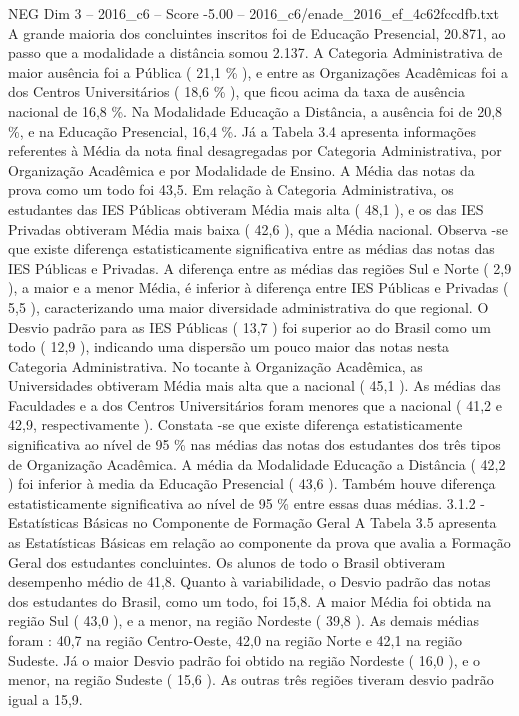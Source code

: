 \begin{textsample}{NEG Dim 3 – 2016\_c6 – Score -5.00 – 2016\_c6/enade\_2016\_ef\_4c62fccdfb.txt}
A grande maioria dos concluintes inscritos foi de Educação Presencial, 20.871, ao passo que a modalidade a distância somou 2.137.
A Categoria Administrativa de maior ausência foi a Pública ( 21,1 \% ), e entre as Organizações Acadêmicas foi a dos Centros Universitários ( 18,6 \% ), que ficou acima da taxa de ausência nacional de 16,8 \%.
Na Modalidade Educação a Distância, a ausência foi de 20,8 \%, e na Educação Presencial, 16,4 \%.
Já a Tabela 3.4 apresenta informações referentes à Média da nota final desagregadas por Categoria Administrativa, por Organização Acadêmica e por Modalidade de Ensino.
A Média das notas da prova como um todo foi 43,5.
Em relação à Categoria Administrativa, os estudantes das IES Públicas obtiveram Média mais alta ( 48,1 ), e os das IES Privadas obtiveram Média mais baixa ( 42,6 ), que a Média nacional.
Observa -se que existe diferença estatisticamente significativa entre as médias das notas das IES Públicas e Privadas.
A diferença entre as médias das regiões Sul e Norte ( 2,9 ), a maior e a menor Média, é inferior à diferença entre IES Públicas e Privadas ( 5,5 ), caracterizando uma maior diversidade administrativa do que regional.
O Desvio padrão para as IES Públicas ( 13,7 ) foi superior ao do Brasil como um todo ( 12,9 ), indicando uma dispersão um pouco maior das notas nesta Categoria Administrativa.
No tocante à Organização Acadêmica, as Universidades obtiveram Média mais alta que a nacional ( 45,1 ).
As médias das Faculdades e a dos Centros Universitários foram menores que a nacional ( 41,2 e 42,9, respectivamente ).
Constata -se que existe diferença estatisticamente significativa ao nível de 95 \% nas médias das notas dos estudantes dos três tipos de Organização Acadêmica.
A média da Modalidade Educação a Distância ( 42,2 ) foi inferior à media da Educação Presencial ( 43,6 ).
Também houve diferença estatisticamente significativa ao nível de 95 \% entre essas duas médias. 3.1.2 - Estatísticas Básicas no Componente de Formação Geral A Tabela 3.5 apresenta as Estatísticas Básicas em relação ao componente da prova que avalia a Formação Geral dos estudantes concluintes.
Os alunos de todo o Brasil obtiveram desempenho médio de 41,8.
Quanto à variabilidade, o Desvio padrão das notas dos estudantes do Brasil, como um todo, foi 15,8.
A maior Média foi obtida na região Sul ( 43,0 ), e a menor, na região Nordeste ( 39,8 ).
As demais médias foram : 40,7 na região Centro-Oeste, 42,0 na região Norte e 42,1 na região Sudeste.
Já o maior Desvio padrão foi obtido na região Nordeste ( 16,0 ), e o menor, na região Sudeste ( 15,6 ).
As outras três regiões tiveram desvio padrão igual a 15,9.

\end{textsample}
